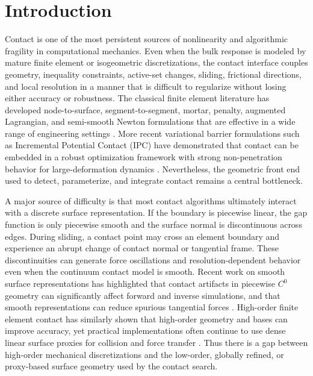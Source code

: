 \documentclass[preprint,12pt]{elsarticle}
\begin{document}
\section{Introduction}
\label{sec:introduction}

Contact is one of the most persistent sources of nonlinearity and algorithmic fragility in computational mechanics. Even when the bulk response is modeled by mature finite element or isogeometric discretizations, the contact interface couples geometry, inequality constraints, active-set changes, sliding, frictional directions, and local resolution in a manner that is difficult to regularize without losing either accuracy or robustness. The classical finite element literature has developed node-to-surface, segment-to-segment, mortar, penalty, augmented Lagrangian, and semi-smooth Newton formulations that are effective in a wide range of engineering settings \cite{laursen2002,wriggers2006,puso2004mortar,puso2004friction}. More recent variational barrier formulations such as Incremental Potential Contact (IPC) have demonstrated that contact can be embedded in a robust optimization framework with strong non-penetration behavior for large-deformation dynamics \cite{li2020ipc}. Nevertheless, the geometric front end used to detect, parameterize, and integrate contact remains a central bottleneck.

A major source of difficulty is that most contact algorithms ultimately interact with a discrete surface representation. If the boundary is piecewise linear, the gap function is only piecewise smooth and the surface normal is discontinuous across edges. During sliding, a contact point may cross an element boundary and experience an abrupt change of contact normal or tangential frame. These discontinuities can generate force oscillations and resolution-dependent behavior even when the continuum contact model is smooth. Recent work on smooth surface representations has highlighted that contact artifacts in piecewise $C^0$ geometry can significantly affect forward and inverse simulations, and that smooth representations can reduce spurious tangential forces \cite{du2024smooth}. High-order finite element contact has similarly shown that high-order geometry and bases can improve accuracy, yet practical implementations often continue to use dense linear surface proxies for collision and force transfer \cite{ferguson2023highorder}. Thus there is a gap between high-order mechanical discretizations and the low-order, globally refined, or proxy-based surface geometry used by the contact search.
\end{document}
